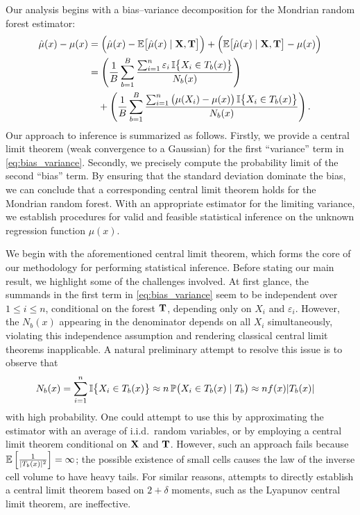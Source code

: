 Our analysis begins with a bias--variance decomposition
for the Mondrian random forest estimator:
%
\begin{align}
  \nonumber
  \hat\mu(x) - \mu(x)
  &=
  \Big( \hat\mu(x) - \mathbb{E} \big[ \hat \mu(x) \mid \mathbf{X}, \mathbf{T} \big]\Big)
  + \Big( \mathbb{E} \big[ \hat \mu(x) \mid \mathbf{X}, \mathbf{T} \big] - \mu(x)\Big) \\
  &=
  \nonumber
  \left(
    \frac{1}{B}
    \sum_{b=1}^B
    \frac{\sum_{i=1}^n \varepsilon_i \, \mathbb{I}\big\{ X_i \in T_b(x) \big\}}
    {N_b(x)}
  \right) \\
  \label{eq:bias_variance}
  &\quad+
  \left(
    \frac{1}{B}
    \sum_{b=1}^B
    \frac{\sum_{i=1}^n \big(\mu(X_i) - \mu(x)\big) \,
    \mathbb{I}\big\{ X_i \in T_b(x) \big\}}
    {N_b(x)}
  \right).
\end{align}
%
Our approach to inference is summarized as follows.
Firstly, we provide a central limit theorem
(weak convergence to a Gaussian)
for the first ``variance'' term in \eqref{eq:bias_variance}.
Secondly, we precisely compute the probability limit of the second
``bias'' term.
By ensuring that the standard deviation dominate the bias,
we can conclude that a corresponding central limit theorem
holds for the Mondrian random forest.
With an appropriate estimator for the limiting variance,
we establish procedures for valid and feasible statistical inference
on the unknown regression function $\mu(x)$.

We begin with the aforementioned central limit theorem,
which forms the core of our methodology for performing statistical inference.
Before stating our main result,
we highlight some of the challenges involved.
At first glance, the summands in the first term in \eqref{eq:bias_variance}
seem to be independent over $1 \leq i \leq n$, conditional
on the forest $\mathbf{T}$, depending only on $X_i$ and $\varepsilon_i$.
However, the $N_b(x)$ appearing in the denominator depends on all $X_i$
simultaneously, violating this independence assumption
and rendering classical central limit theorems inapplicable.
A natural preliminary attempt to resolve this issue is to observe that
%
\begin{align*}
  N_b(x)&=
  \sum_{i=1}^{n} \mathbb{I}\big\{X_i \in T_b(x)\big\}
  \approx
  n \, \mathbb{P} \big( X_i \in T_b(x) \mid T_b \big)
  \approx
  n f(x) |T_b(x)|
\end{align*}
%
with high probability.
One could attempt to use this by
approximating the estimator with an average of
i.i.d.\ random variables, or by
employing a central limit theorem
conditional on $\mathbf{X}$ and $\mathbf{T}$.
However, such an approach fails because
$\mathbb{E} \left[ \frac{1}{|T_b(x)|^2} \right] = \infty$;
the possible existence of small cells causes the law of the
inverse cell volume to have heavy tails.
For similar reasons, attempts to directly establish a central limit theorem
based on $2 + \delta$ moments, such as the Lyapunov central limit theorem,
are ineffective.

